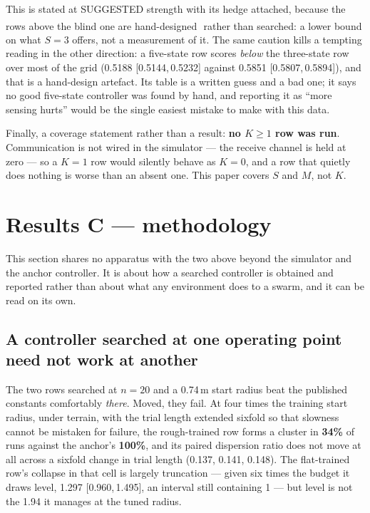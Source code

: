 \documentclass[11pt,a4paper]{article}
\newcommand{\ddg}{\textsuperscript{\ddag}}
\newcommand{\CI}[2]{[#1,\,#2]}
\begin{document}
This is stated at SUGGESTED strength with its hedge attached, because the rows
above the blind one are hand-designed\,\ddg\ rather than searched: a lower bound
on what $S = 3$ offers, not a measurement of it. The same caution kills a tempting
reading in the other direction: a five-state row scores \emph{below} the
three-state row over most of the grid (0.5188 \CI{0.5144}{0.5232} against 0.5851
\CI{0.5807}{0.5894}), and
that is a hand-design artefact. Its table is a written guess and a bad one; it
says no good five-state controller was found by hand, and reporting it as ``more
sensing hurts'' would be the single easiest mistake to make with this data.

Finally, a coverage statement rather than a result: \textbf{no $K \ge 1$ row was
run}. Communication is not wired in the simulator --- the receive channel is held
at zero --- so a $K = 1$ row would silently behave as $K = 0$, and a row that
quietly does nothing is worse than an absent one. This paper covers $S$ and $M$,
not $K$.

\section{Results C --- methodology}
\label{sec:results-c}

This section shares no apparatus with the two above beyond the simulator and the
anchor controller. It is about how a searched controller is obtained and reported
rather than about what any environment does to a swarm, and it can be read on its
own.

\subsection{A controller searched at one operating point need not work at
another}

The two rows searched at $n = 20$ and a 0.74\,m start radius beat the published
constants comfortably \emph{there}. Moved, they fail. At four times the training
start radius, under terrain, with the trial length extended sixfold so that
slowness cannot be mistaken for failure, the rough-trained row forms a cluster in
\textbf{34\%} of runs against the anchor's \textbf{100\%}, and its paired
dispersion ratio does not move at all across a sixfold change in trial length
(0.137, 0.141, 0.148). The flat-trained row's collapse in that cell is largely
truncation --- given six times the budget it draws level, 1.297
\CI{0.960}{1.495}, an interval still containing 1 --- but level is not the 1.94
it manages at the tuned radius.
\end{document}
